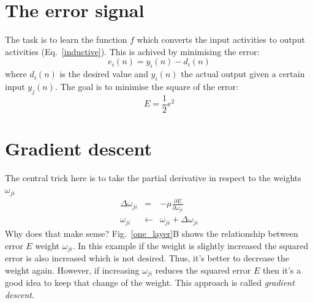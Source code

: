 \documentclass[12pt]{article}
\begin{document}
\section{The error signal}
The task is to learn the function $f$ which converts the input activities to output activities
(Eq.~\ref{inductive}).
This is achived by minimising the error:
\begin{equation}
  e_i(n) = y_i(n) - d_i(n) \label{output_error}
\end{equation}
where $d_i(n)$ is the desired value and $y_i(n)$ the actual output given a certain input $y_j(n)$.
The goal is to minimise the square of the error:
\begin{equation}
  E = \frac{1}{2} e^2 \label{quaderr}
\end{equation}

\section{Gradient descent}
The central trick here is to take the partial derivative in respect to the weights $\omega_{ji}$
\begin{eqnarray}
  \Delta\omega_{ji} & = & - \mu \frac{\partial E}{\partial \omega_{ji}} \label{graddes} \\
  \omega_{ji} & \leftarrow & \omega_{ji} + \Delta\omega_{ji}
\end{eqnarray}
Why does that make sense? Fig.~\ref{one_layer}B shows the relationship between error $E$ weight 
$\omega_{ji}$. In this example if the weight is slightly increased the squared error
is also increased which is not desired. Thus, it's better to decrease the weight again.
However, if increasing $\omega_{ji}$ reduces the squared error $E$ then it's a good idea
to keep that change of the weight. This approach is called \textsl{gradient descent}.
\end{document}
